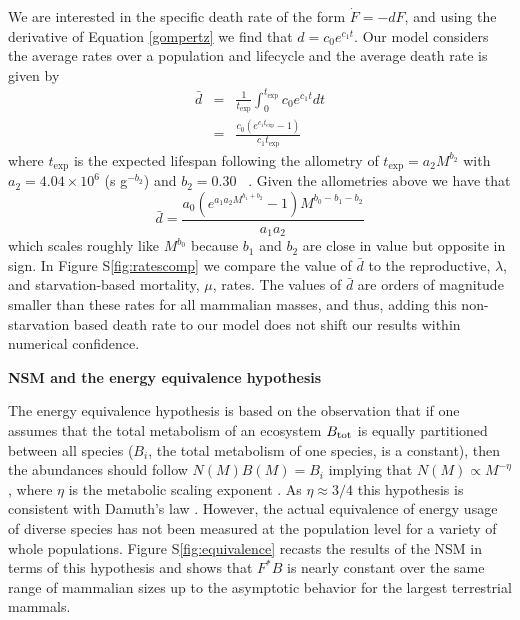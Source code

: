 \documentclass[twocolumn,preprintnumbers,amsmath,amssymb,superscriptaddress]{revtex4}
\begin{document}
We are interested in the specific death rate of the form $\dot{F}=-dF$, and using the derivative of Equation \ref{gompertz} we find that $d=c_{0}e^{c_{1}t}$. Our model considers the average rates over a population and lifecycle and the average death rate is given by 
\begin{eqnarray}
\bar{d}&=&\frac{1}{t_{\text{exp}}}\int_{0}^{t_{\text{exp}}}c_{0}e^{c_{1}t} dt \\
&=&\frac{c_{0}\left(e^{c_{1} t_{\text{exp}}}-1\right)}{c_{1}t_{\text{exp}}}
\end{eqnarray}
where $t_{\text{exp}}$ is the expected lifespan following the allometry of $t_{\text{exp}}=a_{2}M^{b_{2}}$ with $a_{2}=4.04\times10^{6}$ (s g$^{-b_{2}}$) and $b_{2}=0.30$ ~\cite{damuth1982analysis,calder1984}. Given the allometries above we have that
\begin{equation}
\bar{d}=\frac{a_{0} \left(e^{a_{1}a_{2}M^{b_{1}+b_{2}}}-1\right) M^{b_{0}-b_{1}-b_{2}}}{a_{1} a_{2}}
\end{equation}
which scales roughly like $M^{b_{0}}$ because $b_{1}$ and $b_{2}$ are close in value but opposite in sign. In Figure S\ref{fig:ratescomp} we compare the value of $\bar{d}$ to the reproductive, $\lambda$, and starvation-based mortality, $\mu$, rates. The values of $\bar{d}$ are orders of magnitude smaller than these rates for all mammalian masses, and thus, adding this non-starvation based death rate to our model does not shift our results within numerical confidence. 

{\bf NSM and the energy equivalence hypothesis}

The energy equivalence hypothesis is based on the observation that if one assumes that the total metabolism of an ecosystem $B_{\rm tot}$ is equally partitioned between all species ($B_{i}$, the total metabolism of one species, is a constant), then the abundances should follow $N\left(M\right)B\left(M\right)=B_{i}$ implying that $N\left(M\right)\propto M^{-\eta}$, where $\eta$ is the metabolic scaling exponent \citep{allen2002,enquist1998}. As $\eta \approx 3/4$ this hypothesis is consistent with Damuth's law \citep{allen2002}. However, the actual equivalence of energy usage of diverse species has not been measured at the population level for a variety of whole populations. Figure S\ref{fig:equivalence} recasts the results of the NSM in terms of this hypothesis and shows that $F^{*}B$ is nearly constant over the same range of mammalian sizes up to the asymptotic behavior for the largest terrestrial mammals. 
\end{document}
